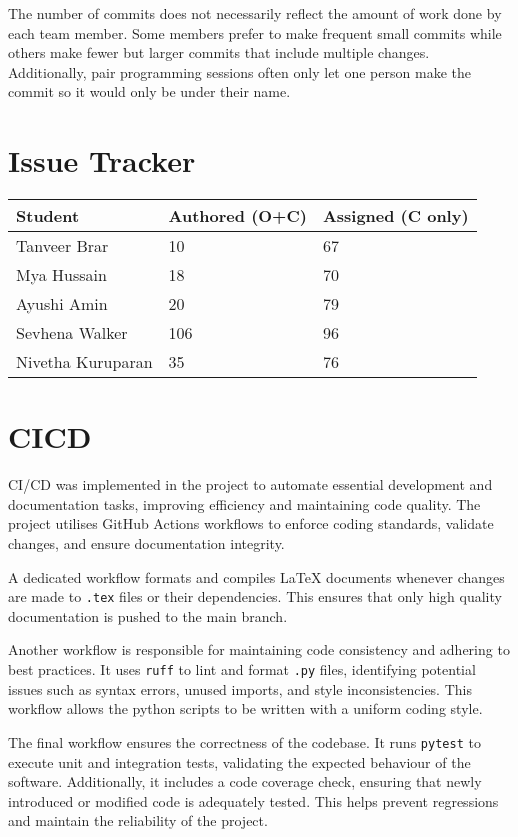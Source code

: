 \documentclass{article}
\begin{document}
The number of commits does not necessarily reflect the amount of work done by each team member. Some members prefer to make frequent small commits while others make fewer but larger commits that include multiple changes.
Additionally, pair programming sessions often only let one person make the commit so it would only be under their name.

\section{Issue Tracker}


\begin{table}[H]
  \centering
  \begin{tabular}{lll}
    \toprule
    \textbf{Student} & \textbf{Authored (O+C)} & \textbf{Assigned (C only)}\\
    \midrule
    Tanveer Brar & 10 & 67 \\
    Mya Hussain & 18 & 70 \\
    Ayushi Amin & 20 & 79 \\
    Sevhena Walker & 106 & 96 \\
    Nivetha Kuruparan & 35 & 76 \\
    \bottomrule
  \end{tabular}
\end{table}


\section{CICD}


CI/CD was implemented in the project to automate essential
development and documentation tasks, improving efficiency and
maintaining code quality. The project utilises GitHub Actions
workflows to enforce coding standards, validate changes, and ensure
documentation integrity.

A dedicated workflow formats and compiles \LaTeX{} documents whenever
changes are made to \texttt{.tex} files or their dependencies. This ensures that
only high quality documentation is pushed to the main branch.

Another workflow is responsible for maintaining code consistency and
adhering to best practices. It uses \texttt{ruff} to lint and format
\texttt{.py} files, identifying potential issues such as syntax
errors, unused imports, and style inconsistencies. This workflow
allows the python scripts to be written with a uniform coding style.

The final workflow ensures the correctness of the codebase. It runs
\texttt{pytest} to execute unit and integration tests, validating the
expected behaviour of the software. Additionally, it includes a code
coverage check, ensuring that newly introduced or modified code is
adequately tested. This helps prevent regressions and maintain the
reliability of the project.
\end{document}
